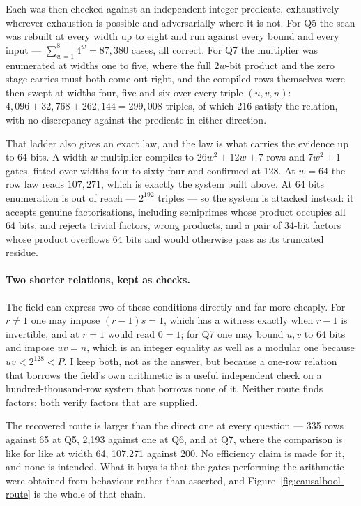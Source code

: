 \documentclass[11pt,a4paper]{article}
\begin{document}
Each was then checked against an independent integer predicate, exhaustively
wherever exhaustion is possible and adversarially where it is not. For Q5 the
scan was rebuilt at every width up to eight and run against every bound and
every input --- $\sum_{w=1}^{8}4^w=87{,}380$ cases, all correct. For Q7 the
multiplier was enumerated at widths one to five, where the full $2w$-bit product
and the zero stage carries must both come out right, and the compiled rows
themselves were then swept at widths four, five and six over every triple
$(u,v,n)$: $4{,}096+32{,}768+262{,}144=299{,}008$ triples, of which 216 satisfy
the relation, with no discrepancy against the predicate in either direction.

That ladder also gives an exact law, and the law is what carries the evidence up
to 64 bits. A width-$w$ multiplier compiles to $26w^2+12w+7$ rows and
$7w^2+1$ gates, fitted over widths four to sixty-four and confirmed at 128. At
$w=64$ the row law reads $107{,}271$, which is exactly the system built above.
At 64 bits enumeration is out of reach --- $2^{192}$ triples --- so the system is
attacked instead: it accepts genuine factorisations, including semiprimes whose
product occupies all 64 bits, and rejects trivial factors, wrong products, and a
pair of 34-bit factors whose product overflows 64 bits and would otherwise pass
as its truncated residue.

\paragraph{Two shorter relations, kept as checks.} The field can express two of
these conditions directly and far more cheaply. For $r\ne1$ one may impose
$(r-1)s=1$, which has a witness exactly when $r-1$ is invertible, and at $r=1$
would read $0=1$; for Q7 one may bound $u,v$ to 64 bits and impose $uv=n$,
which is an integer equality as well as a modular one because $uv<2^{128}<P$. I
keep both, not as the answer, but because a one-row relation that borrows the
field's own arithmetic is a useful independent check on a hundred-thousand-row
system that borrows none of it. Neither route finds factors; both verify
factors that are supplied.

The recovered route is larger than the direct one at every question --- 335 rows
against 65 at Q5, 2{,}193 against one at Q6, and at Q7, where the comparison is
like for like at width 64, 107{,}271 against 200. No efficiency claim is made
for it, and none is intended. What it buys is that the gates performing the
arithmetic were obtained from behaviour rather than asserted, and
Figure~\ref{fig:causalbool-route} is the whole of that chain.
\end{document}

